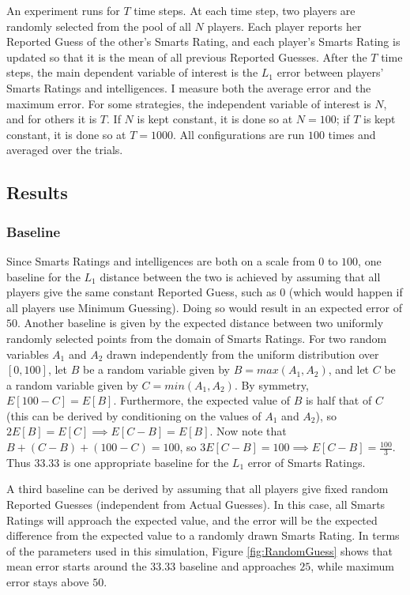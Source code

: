 An experiment runs for $T$ time steps. At each time step, two players are randomly selected from the pool of all $N$ players. Each player reports her Reported Guess of the other's Smarts Rating, and each player's Smarts Rating is updated so that it is the mean of all previous Reported Guesses. After the $T$ time steps, the main dependent variable of interest is the $L_1$ error between players' Smarts Ratings and intelligences. I measure both the average error and the maximum error. For some strategies, the independent variable of interest is $N$, and for others it is $T$. If $N$ is kept constant, it is done so at $N=100$; if $T$ is kept constant, it is done so at $T = 1000$. All configurations are run $100$ times and averaged over the trials.

\subsection{Results}

\subsubsection{Baseline}

Since Smarts Ratings and intelligences are both on a scale from $0$ to $100$, one baseline for the $L_1$ distance between the two is achieved by assuming that all players give the same constant Reported Guess, such as $0$ (which would happen if all players use Minimum Guessing). Doing so would result in an expected error of $50$. Another baseline is given by the expected distance between two uniformly randomly selected points from the domain of Smarts Ratings. For two random variables $A_1$ and $A_2$ drawn independently from the uniform distribution over $[0, 100]$, let $B$ be a random variable given by $B = max(A_1, A_2)$, and let $C$ be a random variable given by $C = min(A_1, A_2)$. By symmetry, $E[100 - C] = E[B]$. Furthermore, the expected value of $B$ is half that of $C$ (this can be derived by conditioning on the values of $A_1$ and $A_2$), so $2E[B] = E[C] \implies E[C-B] = E[B]$. Now note that $B + (C-B) + (100-C) = 100$, so $3E[C-B] = 100 \implies E[C-B] = \frac{100}{3}$. Thus $33.33$ is one appropriate baseline for the $L_1$ error of Smarts Ratings.

A third baseline can be derived by assuming that all players give fixed random Reported Guesses (independent from Actual Guesses). In this case, all Smarts Ratings will approach the expected value, and the error will be the expected difference from the expected value to a randomly drawn Smarts Rating. In terms of the parameters used in this simulation, Figure \ref{fig:RandomGuess} shows that mean error starts around the $33.33$ baseline and approaches $25$, while maximum error stays above $50$. 


